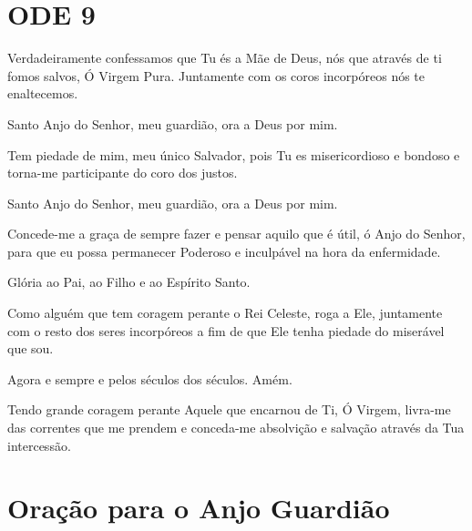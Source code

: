 \documentclass{subfiles}
\begin{document}
\section{ODE 9}

\eirmos{}Verdadeiramente confessamos que Tu és a Mãe de Deus, nós que
através de ti fomos salvos, Ó Virgem Pura. Juntamente com os coros
incorpóreos nós te enaltecemos.

Santo Anjo do Senhor, meu guardião, ora a Deus por mim.

Tem piedade de mim, meu único Salvador, pois Tu es misericordioso e
bondoso e torna-me participante do coro dos justos.

Santo Anjo do Senhor, meu guardião, ora a Deus por mim.

Concede-me a graça de sempre fazer e pensar aquilo que é útil, ó Anjo
do Senhor, para que eu possa permanecer Poderoso e inculpável na hora da
enfermidade.

Glória ao Pai, ao Filho e ao Espírito Santo.

Como alguém que tem coragem perante o Rei Celeste, roga a Ele,
juntamente com o resto dos seres incorpóreos a fim de que Ele tenha piedade
do miserável que sou.

Agora e sempre e pelos séculos dos séculos. Amém.

Tendo grande coragem perante Aquele que encarnou de Ti, Ó Virgem,
livra-me das correntes que me prendem e conceda-me absolvição e salvação
através da Tua intercessão.

\section{Oração para o Anjo Guardião}
\end{document}
